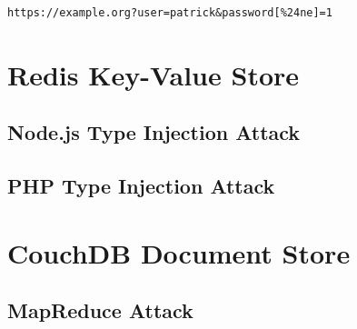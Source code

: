 \begin{lstlisting}[caption={MongoDB injection with PHP's associative arrays}, label={lst:PHPArrayInjection}]
https://example.org?user=patrick&password[%24ne]=1
\end{lstlisting}


\section{Redis Key-Value Store}
\subsection{Node.js Type Injection Attack}
\subsection{PHP Type Injection Attack}

\section{CouchDB Document Store}
\subsection{MapReduce Attack}